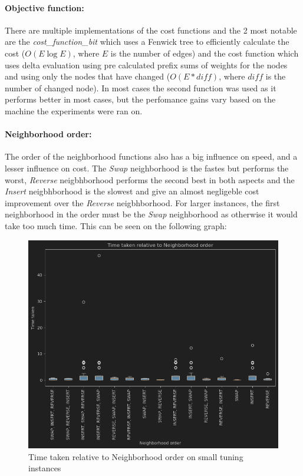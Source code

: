 \documentclass{article}
\begin{document}
\paragraph{Objective function:}
There are multiple implementations of the cost functions and the 2 most notable are the \textit{cost\_function\_bit} which uses a Fenwick tree to efficiently calculate the cost ($O(E \log E)$, where $E$ is the number of edges) and the cost function which uses delta evaluation using pre calculated prefix sums of weights for the nodes and using only the nodes that have changed ($O(E*diff)$, where $diff$ is the number of changed node). In most cases the second function was used as it performs better in most cases, but the perfomance gains vary based on the machine the experiments were ran on.

\paragraph{Neighborhood order:}
The order of the neighborhood functions also has a big influence on speed, and a lesser influence on cost. The \textit{Swap} neighborhood is the fastes but performs the worst, \textit{Reverse} neigbhborhood performs the second best in both aspects and the \textit{Insert} neigbhborhood is the slowest and give an almost negligeble cost improvement over the \textit{Reverse} neigbhborhood. For larger instances, the first neighborhood in the order must be the \textit{Swap} neighborhood as otherwise it would take too much time. This can be seen on the following graph:
\begin{figure}[H]
	\includegraphics[width=\linewidth]{time_norder_vnd_small.png}
	\caption{Time taken relative to Neighborhood order on small tuning instances}
\end{figure}
\end{document}
